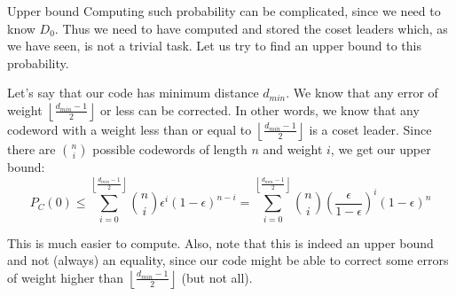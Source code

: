\documentclass[a4paper]{article}
\begin{document}
\begin{parag}{Upper bound}
    Computing such probability can be complicated, since we need to know $D_0$. Thus we need to have computed and stored the coset leaders which, as we have seen, is not a trivial task. Let us try to find an upper bound to this probability.

    Let's say that our code has minimum distance $d_{min}$. We know that any error of weight $\left\lfloor \frac{d_{min} - 1}{2} \right\rfloor $ or less can be corrected. In other words, we know that any codeword with a weight less than or equal to $\left\lfloor \frac{d_{min} - 1}{2} \right\rfloor $ is a coset leader. Since there are $\binom{n}{i}$ possible codewords of length $n$ and weight $i$, we get our upper bound: 
    \[P_C\left(0\right) \leq \sum_{i=0}^{\left\lfloor \frac{d_{min} - 1}{2} \right\rfloor } \binom{n}{i} \epsilon^i \left(1 - \epsilon\right)^{n-i} = \sum_{i=0}^{\left\lfloor \frac{d_{min} - 1}{2} \right\rfloor } \binom{n}{i} \left(\frac{\epsilon}{1 - \epsilon}\right)^i \left(1 - \epsilon\right)^{n}\]
     
    This is much easier to compute. Also, note that this is indeed an upper bound and not (always) an equality, since our code might be able to correct some errors of weight higher than $\left\lfloor \frac{d_{min} -  1}{2} \right\rfloor $ (but not all).
\end{parag}
\end{document}
